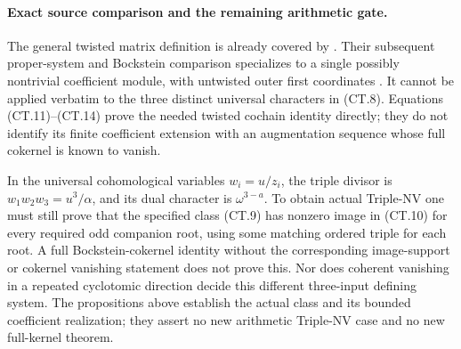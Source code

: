 \paragraph{Exact source comparison and the remaining arithmetic gate.}
The general twisted matrix definition is already covered by
\cite[Definitions~3.1.3, 3.2.1--3.2.2, pp.~22--23]{LLSWW2023}.
Their subsequent proper-system and Bockstein comparison specializes
to a single possibly nontrivial coefficient module, with untwisted
outer first coordinates
\cite[Definitions~3.3.1--3.3.2 and Theorems~3.3.4, 4.1.2,
pp.~24--29]{LLSWW2023}. It cannot be applied verbatim to the
three distinct universal characters in (CT.8). Equations
(CT.11)--(CT.14) prove the needed twisted cochain identity directly;
they do not identify its finite coefficient extension with an
augmentation sequence whose full cokernel is known to vanish.

In the universal cohomological variables \(w_i=u/z_i\), the
triple divisor is \(w_1w_2w_3=u^3/\alpha\), and its dual
character is \(\omega^{3-a}\). To obtain actual Triple-NV one
must still prove that the specified class (CT.9) has nonzero image
in (CT.10) for every required odd companion root, using some
matching ordered triple for each root. A full Bockstein-cokernel
identity without the corresponding image-support or cokernel
vanishing statement does not prove this. Nor does coherent
vanishing in a repeated cyclotomic direction decide this different
three-input defining system. The propositions above establish the
actual class and its bounded coefficient realization; they assert
no new arithmetic Triple-NV case and no new full-kernel theorem.
